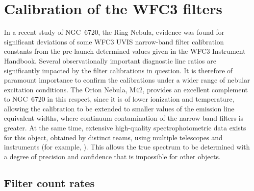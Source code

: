 \documentclass[preprint, 12pt]{aastex}
\begin{document}
\newcommand\Pixel{\ensuremath{\Omega_{\mathrm{pix}}}}
\newcommand\Area{\ensuremath{A_{\mathrm{HST}}}}
\newcommand\T[2]{\ensuremath{T_{#1}^{#2}}}
\newcommand\Tlam[1]{\T{\lambda}{#1}}
\newcommand\Tmax[1]{\T{\mathrm{m}}{#1}}
\newcommand\Mean[1]{\ensuremath{\bigl\langle \lambda I_\lambda \bigr\rangle_{#1}}}
\newcommand\MeanC[1]{\ensuremath{\bigl\langle \lambda
    I_\lambda^{\mathrm{cont}} \bigr\rangle_{#1}}}
\newcommand\Color[2]{\ensuremath{k_{#1, #2}}}
\newcommand\COLOR[2]{\ensuremath{\widetilde{k}_{#1, #2}}}
\newcommand\Weff[2]{\ensuremath{\widetilde{W}_{#1, #2}}}
\newcommand\U[1]{\ensuremath{\mathrm{#1}}}
\newcommand\E[1]{\ensuremath{\times 10^{#1}}}
\newcommand\Elam{\ensuremath{\varepsilon_\lambda}}
\newcommand\Constant{\ensuremath{C_{\mathrm{WFC3}}}}
\newcommand\Narrow{\mathrm{N}}
\newcommand\Wide{\mathrm{W}}
\newcommand\Contam{\ensuremath{{i'}}} %

\section{Calibration of the WFC3 filters}

In a recent study \citep{ODell:2013b} of NGC~6720, the Ring Nebula,
evidence was found for significant deviations of some WFC3 UVIS
narrow-band filter calibration constants from the pre-launch
determined values given in the WFC3 Instrument Handbook.  Several
observationally important diagnostic line ratios are significantly
impacted by the filter calibrations in question.  It is therefore of
paramount importance to confirm the calibrations under a wider range
of nebular excitation conditions.  The Orion Nebula, M42, provides an
excellent complement to NGC~6720 in this respect, since it is of lower
ionization and temperature, allowing the calibration to be extended to
smaller values of the emission line equivalent widths, where continuum
contamination of the narrow band filters is greater.  At the same
time, extensive high-quality spectrophotometric data exists for this object,
obtained by distinct teams, using multiple telescopes and instruments
(for example, \citealp{Mesa-Delgado:2008b, ODell:2010a}).  This allows
the true spectrum to be determined with a degree of precision and
confidence that is impossible for other objects.

\subsection{Filter count rates}
\label{sec:counts}
\end{document}
